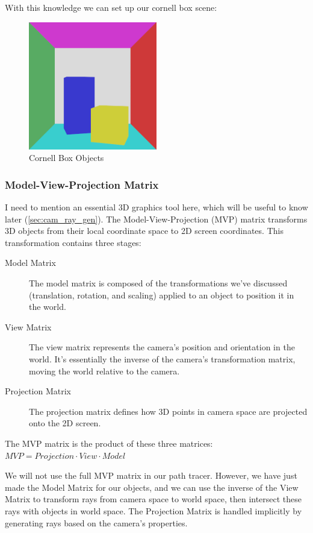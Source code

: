 \documentclass[12pt]{article}
\begin{document}
With this knowledge we can set up our cornell box scene:
\begin{figure}[H]
    \centering
    \includegraphics[width=0.5\textwidth]{images/artsy_rep/no_lighting_cornell.png}
    \caption{Cornell Box Objects}
    \label{fig:unlitcornell}
\end{figure}

\subsubsection{Model-View-Projection Matrix}
I need to mention an essential 3D graphics tool here, which will be useful to know later (\ref{sec:cam_ray_gen}). The Model-View-Projection (MVP) matrix transforms 3D objects from their local coordinate space to 2D screen coordinates. This transformation contains three stages:

\begin{description}
    \item[Model Matrix] The model matrix is composed of the transformations we've discussed (translation, rotation, and scaling) applied to an object to position it in the world.

    \item[View Matrix] The view matrix represents the camera's position and orientation in the world. It's essentially the inverse of the camera's transformation matrix, moving the world relative to the camera.

    \item[Projection Matrix] The projection matrix defines how 3D points in camera space are projected onto the 2D screen.

\end{description}

The MVP matrix is the product of these three matrices:
$MVP = Projection \cdot View \cdot Model $

We will not use the full MVP matrix in our path tracer. However, we have just made the Model Matrix for our objects, and we can use the inverse of the View Matrix to transform rays from camera space to world space, then intersect these rays with objects in world space. The Projection Matrix is handled implicitly by generating rays based on the camera's properties.
\end{document}
